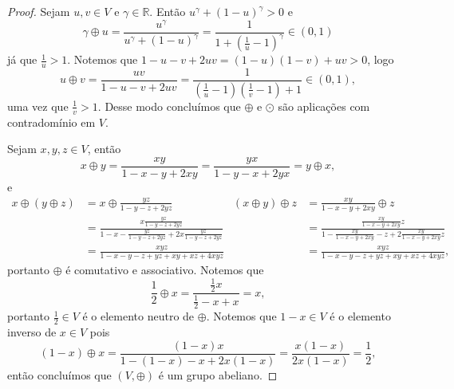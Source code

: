 \begin{proof}
    Sejam \(u, v \in V\) e \(\gamma \in \mathbb{R}\). Então \(u^\gamma + (1 - u)^\gamma > 0\) e
    \begin{equation*}
        \gamma \oplus u = \frac{u^\gamma}{u^\gamma + (1 - u)^\gamma} = \frac{1}{1 + \left(\frac{1}{u} - 1\right)^\gamma} \in (0,1)
    \end{equation*}
    já que \(\frac{1}{u} > 1\). Notemos que \(1 - u - v + 2uv = (1 - u)(1 - v) + uv > 0\), logo
    \begin{equation*}
        u \oplus v = \frac{uv}{1 - u - v + 2uv} = \frac{1}{\left(\frac{1}{u} - 1\right)(\frac{1}{v} - 1) + 1} \in (0,1),
    \end{equation*}
    uma vez que \(\frac{1}{v} > 1\). Desse modo concluímos que \(\oplus\) e \(\odot\) são aplicações com contradomínio em \(V\).

    Sejam \(x, y, z \in V\), então
    \begin{equation*}
        x \oplus y = \frac{xy}{1 - x - y + 2xy} = \frac{yx}{1 - y - x + 2yx} = y \oplus x,
    \end{equation*}
    e
    \begin{align*}
        x \oplus (y \oplus z) &= x \oplus \frac{yz}{1 - y - z + 2yz}&
        (x \oplus y) \oplus z &= \frac{xy}{1 - x - y + 2xy} \oplus z\\
                              &= \frac{x\frac{yz}{1 - y - z + 2yz}}{1 - x - \frac{yz}{1 - y - z + 2yz} + 2x\frac{yz}{1 - y - z + 2yz}}&
                              &= \frac{\frac{xy}{1 - x - y + 2xy}z }{1 - \frac{xy}{1 - x - y + 2xy} - z + 2\frac{xy}{1 - x - y + 2xy}z}\\
                              &= \textstyle\frac{xyz}{1- x - y - z + yz + xy + xz + 4xyz}&
                              &= \textstyle\frac{xyz}{1 - x - y - z + yz + xy + xz + 4x yz},
    \end{align*}
    portanto \(\oplus\) é comutativo e associativo. Notemos que
    \begin{equation*}
        \frac12 \oplus x = \frac{\frac12x}{\frac12 - x + x} = x,
    \end{equation*}
    portanto \(\frac12 \in V\) é o elemento neutro de \(\oplus\). Notemos que \(1 - x \in V\) é o elemento inverso de \(x \in V\) pois
    \begin{equation*}
        (1-x) \oplus x = \frac{(1-x)x}{1 - (1 - x) - x + 2x(1-x)} = \frac{x(1-x)}{2x(1-x)} = \frac12,
    \end{equation*}
    então concluímos que \((V, \oplus)\) é um grupo abeliano.


\end{proof}
